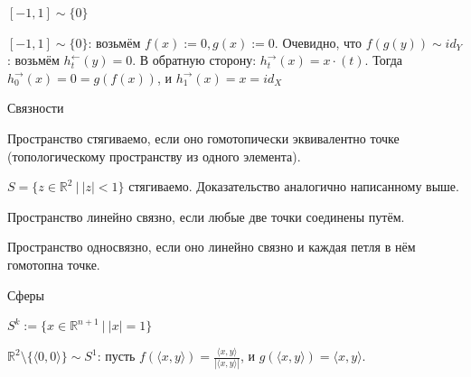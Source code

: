 \documentclass[aspectratio=169,dvipsnames,usenames]{beamer}
\begin{document}
\begin{frame}{$[-1,1] \sim \{0\}$}

$[-1,1] \sim \{0\}$: возьмём $f(x) := 0, g(x) := 0$. Очевидно, что $f(g(y)) \sim id_Y$: возьмём $h^\leftarrow_t(y) = 0$.
В обратную сторону: $h^\rightarrow_t(x) = x\cdot (t)$. Тогда $h^\rightarrow_0(x) = 0 = g(f(x))$, и
$h^\rightarrow_1(x) = x = id_X$

\begin{center}\end{center}\vspace{-0.3cm}

\end{frame}

\begin{frame}{Связности}
\begin{dfn}
Пространство стягиваемо, если оно гомотопически эквивалентно точке (топологическому пространству из одного элемента).
\end{dfn}

\begin{exm}
$S = \{z\in\mathbb{R}^2\ |\ |z| < 1\}$ стягиваемо. Доказательство аналогично написанному выше.
\end{exm}

\begin{dfn}
Пространство линейно связно, если любые две точки соединены путём.

Пространство односвязно, если оно линейно связно и каждая петля в нём гомотопна точке.
\end{dfn}

\end{frame}

\begin{frame}{Сферы}
\begin{dfn}
$S^k := \{ x \in \mathbb{R}^{n+1}\ |\ |x| = 1\}$
\end{dfn}
\begin{exm}
$\mathbb{R}^2\setminus\{\langle 0,0\rangle\} \sim S^1$: пусть $f(\langle x,y \rangle) = \frac{\langle x, y \rangle}{|\langle x, y \rangle|}$, и $g(\langle x,y\rangle) = \langle x, y \rangle$.
\end{exm}
\end{frame}
\end{document}
